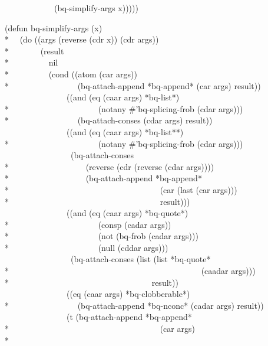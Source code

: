 \begin{new}
\begin{lisp}
~~~~~~~~~~~~(bq-simplify-args x)))))
\end{lisp}
\begin{lisp}
(defun bq-simplify-args (x) \\*
~~(do ((args (reverse (cdr x)) (cdr args)) \\*
~~~~~~~(result \\*
~~~~~~~~~nil \\*
~~~~~~~~~(cond ((atom (car args)) \\*
~~~~~~~~~~~~~~~~(bq-attach-append *bq-append* (car args) result)) \\
~~~~~~~~~~~~~~~((and (eq (caar args) *bq-list*) \\*
~~~~~~~~~~~~~~~~~~~~~(notany \#'bq-splicing-frob (cdar args))) \\*
~~~~~~~~~~~~~~~~(bq-attach-conses (cdar args) result)) \\
~~~~~~~~~~~~~~~((and (eq (caar args) *bq-list**) \\*
~~~~~~~~~~~~~~~~~~~~~(notany \#'bq-splicing-frob (cdar args))) \\
~~~~~~~~~~~~~~~~(bq-attach-conses \\*
~~~~~~~~~~~~~~~~~~(reverse (cdr (reverse (cdar args)))) \\*
~~~~~~~~~~~~~~~~~~(bq-attach-append *bq-append* \\*
~~~~~~~~~~~~~~~~~~~~~~~~~~~~~~~~~~~~(car (last (car args))) \\*
~~~~~~~~~~~~~~~~~~~~~~~~~~~~~~~~~~~~result))) \\
~~~~~~~~~~~~~~~((and (eq (caar args) *bq-quote*) \\*
~~~~~~~~~~~~~~~~~~~~~(consp (cadar args)) \\*
~~~~~~~~~~~~~~~~~~~~~(not (bq-frob (cadar args))) \\*
~~~~~~~~~~~~~~~~~~~~~(null (cddar args))) \\
~~~~~~~~~~~~~~~~(bq-attach-conses (list (list *bq-quote* \\*
~~~~~~~~~~~~~~~~~~~~~~~~~~~~~~~~~~~~~~~~~~~~~~(caadar args))) \\*
~~~~~~~~~~~~~~~~~~~~~~~~~~~~~~~~~~result)) \\
~~~~~~~~~~~~~~~((eq (caar args) *bq-clobberable*) \\*
~~~~~~~~~~~~~~~~(bq-attach-append *bq-nconc* (cadar args) result)) \\
~~~~~~~~~~~~~~~(t (bq-attach-append *bq-append* \\*
~~~~~~~~~~~~~~~~~~~~~~~~~~~~~~~~~~~~(car args) \\*

\end{lisp}
\end{new}
